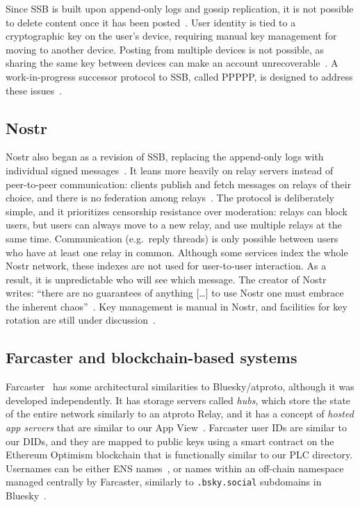 \documentclass[sigconf]{acmart}
\begin{document}
Since SSB is built upon append-only logs and gossip replication, it is not possible to delete content once it has been posted~\cite{SSBDeletion}.
User identity is tied to a cryptographic key on the user's device, requiring manual key management for moving to another device.
Posting from multiple devices is not possible, as sharing the same key between devices can make an account unrecoverable~\cite{SSBMultiDevice}.
A work-in-progress successor protocol to SSB, called PPPPP, is designed to address these issues~\cite{PPPPP}.

\subsection{Nostr}

Nostr also began as a revision of SSB, replacing the append-only logs with individual signed messages~\cite{SSBNostr}.
It leans more heavily on relay servers instead of peer-to-peer communication: clients publish and fetch messages on relays of their choice, and there is no federation among relays~\cite{Nostr}.
The protocol is deliberately simple, and it prioritizes censorship resistance over moderation: relays can block users, but users can always move to a new relay, and use multiple relays at the same time.
Communication (e.g.\ reply threads) is only possible between users who have at least one relay in common.
Although some services index the whole Nostr network, these indexes are not used for user-to-user interaction.
As a result, it is unpredictable who will see which message.
The creator of Nostr writes: ``there are no guarantees of anything [\dots] to use Nostr one must embrace the inherent chaos''~\cite{NostrVision}. 
Key management is manual in Nostr, and facilities for key rotation are still under discussion~\cite{NostrKeyRotation}.


\subsection{Farcaster and blockchain-based systems}

Farcaster~\cite{Farcaster} has some architectural similarities to Bluesky/atproto, although it was developed independently.
It has storage servers called \emph{hubs}, which store the state of the entire network similarly to an atproto Relay, and it has a concept of \emph{hosted app servers} that are similar to our App View~\cite{FarcasterOverview}.
Farcaster user IDs are similar to our DIDs, and they are mapped to public keys using a smart contract on the Ethereum Optimism blockchain that is functionally similar to our PLC directory.
Usernames can be either ENS names~\cite{ENS}, or names within an off-chain namespace managed centrally by Farcaster, similarly to \texttt{.bsky.social} subdomains in Bluesky~\cite{FarcasterArchitecture}.
\end{document}
